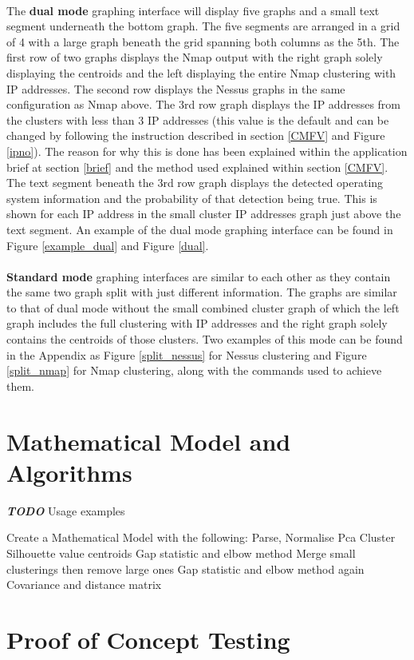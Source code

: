\paragraph{}The \textbf{dual mode} graphing interface will display five graphs and a small text segment underneath the bottom graph. The five segments are arranged in a grid of 4 with a large graph beneath the grid spanning both columns as the 5th. The first row of two graphs displays the Nmap output with the right graph solely displaying the centroids and the left displaying the entire Nmap clustering with IP addresses. The second row displays the Nessus graphs in the same configuration as Nmap above. The 3rd row graph displays the IP addresses from the clusters with less than 3 IP addresses (this value is the default and can be changed by following the instruction described in section \ref{CMFV} and Figure \ref{ipno}). The reason for why this is done has been explained within the application brief at section \ref{brief} and the method used explained within section \ref{CMFV}. The text segment beneath the 3rd row graph displays the detected operating system information and the probability of that detection being true. This is shown for each IP address in the small cluster IP addresses graph just above the text segment. An example of the dual mode graphing interface can be found in Figure \ref{example_dual} and Figure \ref{dual}.\linebreak
\paragraph{}\textbf{Standard mode} graphing interfaces are similar to each other as they contain the same two graph split with just different information. The graphs are similar to that of dual mode without the small combined cluster graph of which the left graph includes the full clustering with IP addresses and the right graph solely contains the centroids of those clusters. Two examples of this mode can be found in the Appendix as Figure \ref{split_nessus} for Nessus clustering and Figure \ref{split_nmap} for Nmap clustering, along with the commands used to achieve them. 

\section{Mathematical Model and Algorithms}
\label{models}
\textbf{\textit{TODO}}
Usage examples

Create a Mathematical Model with the following:
Parse,
Normalise
Pca
Cluster
Silhouette value
centroids
Gap statistic and elbow method
Merge small clusterings then remove large ones
Gap statistic and elbow method again
Covariance and distance matrix


\section{Proof of Concept Testing}
\label{poc}


